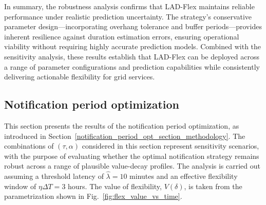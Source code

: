 \documentclass[preprint,12pt]{elsarticle}
\begin{document}
In summary, the robustness analysis confirms that LAD-Flex maintains reliable performance under realistic prediction uncertainty. The strategy's conservative parameter design—incorporating overhang tolerance and buffer periods—provides inherent resilience against duration estimation errors, ensuring operational viability without requiring highly accurate prediction models. Combined with the sensitivity analysis, these results establish that LAD-Flex can be deployed across a range of parameter configurations and prediction capabilities while consistently delivering actionable flexibility for grid services. 





























































\subsection{Notification period optimization} \label{notification_results}

This section presents the results of the notification period optimization, as introduced in Section~\ref{notification_period_opt_section_methodology}. The combinations of $(\tau, \alpha)$ considered in this section represent sensitivity scenarios, with the purpose of evaluating whether the optimal notification strategy remains robust across a range of plausible value-decay profiles. The analysis is carried out assuming a threshold latency of $\hat{\lambda} = 10$ minutes and an effective flexibility window of $\eta \Delta T = 3$ hours. The value of flexibility, $V(\delta)$, is taken from the parametrization shown in Fig.~\ref{fig:flex_value_vs_time}.
\end{document}
